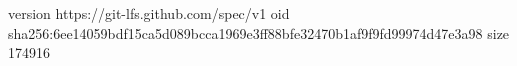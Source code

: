 version https://git-lfs.github.com/spec/v1
oid sha256:6ee14059bdf15ca5d089bcca1969e3ff88bfe32470b1af9f9fd99974d47e3a98
size 174916
